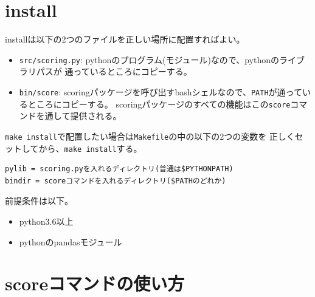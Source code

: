 \section{install}
\label{install}

installは以下の2つのファイルを正しい場所に配置すればよい。

\begin{itemize}
\item \texttt{src\slash scoring.py}: pythonのプログラム(モジュール)なので、pythonのライブラリパスが
通っているところにコピーする。

\item \texttt{bin\slash score}: scoringパッケージを呼び出すbashシェルなので、\texttt{PATH}が通っているところにコピーする。
scoringパッケージのすべての機能はこの\texttt{score}コマンドを通して提供される。

\end{itemize}

\texttt{make install}で配置したい場合は\texttt{Makefile}の中の以下の2つの変数を
正しくセットしてから、\texttt{make install}する。
\begin{tcolorbox}[enhanced jigsaw,breakable,colframe=\mycolor ,colback=white,colbacktitle=\mycolor ,coltitle=white,fonttitle=\bfseries\sffamily]

\begin{verbatim}
pylib = scoring.pyを入れるディレクトリ(普通は$PYTHONPATH)
bindir = scoreコマンドを入れるディレクトリ($PATHのどれか)
\end{verbatim}

\end{tcolorbox}

前提条件は以下。

\begin{itemize}
\item python3.6以上

\item pythonのpandasモジュール

\end{itemize}

\section{scoreコマンドの使い方}
\label{scoreコマンドの使い方}

